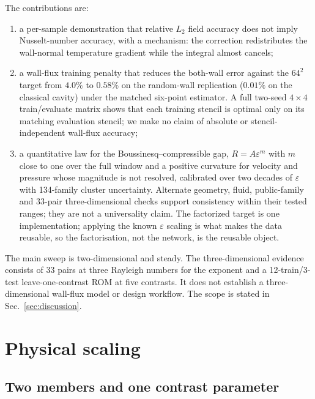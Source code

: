 \documentclass[preprint,11pt,a4paper,times]{elsarticle}
\begin{document}
The contributions are:
\begin{enumerate}
\item a per-sample demonstration that relative $L_2$ field accuracy does not imply
Nusselt-number accuracy, with a mechanism: the correction redistributes the wall-normal
temperature gradient while the integral almost cancels;
\item a wall-flux training penalty that reduces the both-wall error against the $64^2$ target
from $4.0\%$ to $0.58\%$ on the random-wall replication ($0.01\%$ on the classical cavity)
under the matched six-point estimator. A full two-seed $4\times4$ train/evaluate matrix shows
that each training stencil is optimal only on its matching evaluation stencil; we make no
claim of absolute or stencil-independent wall-flux accuracy;
\item a quantitative law for the Boussinesq--compressible gap, $R=A\varepsilon^m$ with
$m$ close to one over the full window and a positive curvature for velocity and pressure whose
magnitude is not resolved, calibrated over two decades of $\varepsilon$ with 134-family
cluster uncertainty. Alternate geometry, fluid, public-family and 33-pair three-dimensional
checks support consistency within their tested ranges; they are not a universality claim.
The factorized target is one
implementation; applying the known $\varepsilon$ scaling is what makes the data reusable, so
the factorisation, not the network, is the reusable object.
\end{enumerate}

The main sweep is two-dimensional and steady. The three-dimensional evidence consists of
33 pairs at three Rayleigh numbers for the exponent and a 12-train/3-test leave-one-contrast
ROM at five contrasts. It does not establish a three-dimensional wall-flux model or design
workflow. The scope is stated in Sec.~\ref{sec:discussion}.

\section{Physical scaling}
\label{sec:theory}

\subsection{Two members and one contrast parameter}
\end{document}
